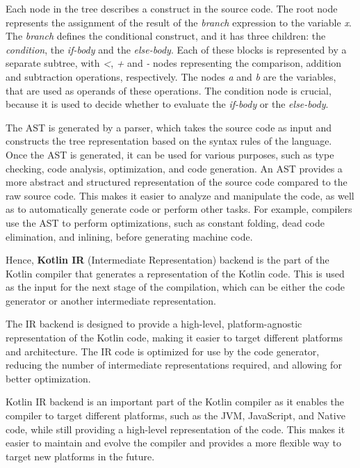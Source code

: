 Each node in the tree describes a construct in the source code. The root node represents the assignment of the result of the \textit{branch} expression to the variable \textit{x}. The \textit{branch} defines the conditional construct, and it has three children: the \textit{condition}, the \textit{if-body} and the \textit{else-body}. Each of these blocks is represented by a separate subtree, with \textit{<}, \textit{+} and \textit{-} nodes representing the comparison, addition and subtraction operations, respectively. The nodes \textit{a} and \textit{b} are the variables, that are used as operands of these operations.\newline
The condition node is crucial, because it is used to decide whether to evaluate the \textit{if-body} or the \textit{else-body}.

The AST is generated by a parser, which takes the source code as input and constructs the tree representation based on the syntax rules of the language. Once the AST is generated, it can be used for various purposes, such as type checking, code analysis, optimization, and code generation.\newline
An AST provides a more abstract and structured representation of the source code compared to the raw source code. This makes it easier to analyze and manipulate the code, as well as to automatically generate code or perform other tasks. For example, compilers use the AST to perform optimizations, such as constant folding, dead code elimination, and inlining, before generating machine code.

Hence, \textbf{Kotlin IR} (Intermediate Representation) backend is the part of the Kotlin compiler that generates a representation of the Kotlin code. This is used as the input for the next stage of the compilation, which can be either the code generator or another intermediate representation.

The IR backend is designed to provide a high-level, platform-agnostic representation of the Kotlin code, making it easier to target different platforms and architecture. The IR code is optimized for use by the code generator, reducing the number of intermediate representations required, and allowing for better optimization.

Kotlin IR backend is an important part of the Kotlin compiler as it enables the compiler to target different platforms, such as the JVM, JavaScript, and Native code, while still providing a high-level representation of the code. This makes it easier to maintain and evolve the compiler and provides a more flexible way to target new platforms in the future.

